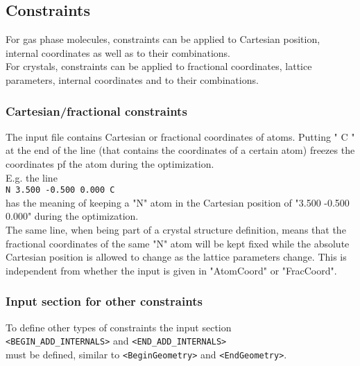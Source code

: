 \documentclass[prl,aps,preprint,superbib,12pt]{revtex4}
\begin{document}
\subsection{Constraints}

For gas phase molecules, constraints can be applied to 
Cartesian position, internal coordinates as well as to their 
combinations.
\\
For crystals, constraints can be applied to fractional coordinates,
lattice parameters, internal coordinates and to their combinations.

\subsubsection{Cartesian/fractional constraints}
The input file contains Cartesian or fractional coordinates of atoms.
Putting " C " at the end of the line (that contains the coordinates
of a certain atom) freezes the coordinates pf the atom during the optimization.
\\
E.g. the line
\\
{\tt N    3.500  -0.500   0.000 C}
\\
has the meaning of keeping a "N" atom in the Cartesian position
of "3.500  -0.500   0.000" during the optimization. 
\\
The same line, when
being part of a crystal structure definition, means that
the fractional coordinates of the same "N" atom will be kept fixed
while the absolute Cartesian position is allowed to change as the 
lattice parameters change. This is independent from whether 
the input is given in "AtomCoord" or "FracCoord".

\subsubsection{Input section for other constraints}
To define other types of constraints the input section
\\
{\tt <BEGIN\_ADD\_INTERNALS>} and {\tt <END\_ADD\_INTERNALS>}
\\
must be defined, similar to {\tt <BeginGeometry>} and
{\tt <EndGeometry>}.
\end{document}
